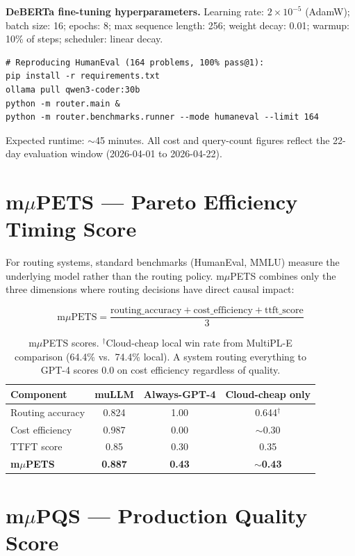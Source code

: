 \documentclass[11pt]{article}
\begin{document}
\textbf{DeBERTa fine-tuning hyperparameters.}
Learning rate: $2 \times 10^{-5}$ (AdamW); batch size: 16; epochs: 8;
max sequence length: 256; weight decay: 0.01; warmup: 10\% of steps;
scheduler: linear decay.

\begin{lstlisting}
# Reproducing HumanEval (164 problems, 100% pass@1):
pip install -r requirements.txt
ollama pull qwen3-coder:30b
python -m router.main &
python -m router.benchmarks.runner --mode humaneval --limit 164
\end{lstlisting}

Expected runtime: $\sim$45 minutes. All cost and query-count figures
reflect the 22-day evaluation window (2026-04-01 to 2026-04-22).

\section{m$\mu$PETS --- Pareto Efficiency Timing Score}

For routing systems, standard benchmarks (HumanEval, MMLU) measure the
underlying model rather than the routing policy. m$\mu$PETS combines
only the three dimensions where routing decisions have direct causal
impact:

\[
\text{m}\mu\text{PETS} = \frac{\text{routing\_accuracy} + \text{cost\_efficiency} + \text{ttft\_score}}{3}
\]

\begin{table}[h]
\centering
\small
\begin{tabular}{lccc}
\toprule
\textbf{Component} & \textbf{muLLM} & \textbf{Always-GPT-4} & \textbf{Cloud-cheap only} \\
\midrule
Routing accuracy & 0.824 & 1.00 & 0.644$^\dagger$ \\
Cost efficiency & 0.987 & 0.00 & $\sim$0.30 \\
TTFT score & 0.85 & 0.30 & 0.35 \\
\midrule
\textbf{m$\mu$PETS} & \textbf{0.887} & \textbf{0.43} & \textbf{$\sim$0.43} \\
\bottomrule
\end{tabular}
\caption{m$\mu$PETS scores. $^\dagger$Cloud-cheap local win rate from
MultiPL-E comparison (64.4\% vs.\ 74.4\% local). A system routing
everything to GPT-4 scores 0.0 on cost efficiency regardless of quality.}
\label{tab:mpets}
\end{table}

\section{m$\mu$PQS --- Production Quality Score}
\end{document}
